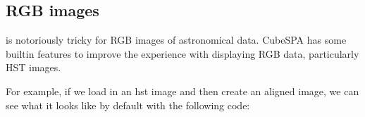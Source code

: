 \documentclass[letterpaper,10pt,english]{sphinxmanual}
\begin{document}
\subsection{RGB images}
\label{\detokenize{getting_started:rgb-images}}
\sphinxAtStartPar
{} is notoriously tricky for RGB images of astronomical data. CubeSPA has some built\sphinxhyphen{}in features
to improve the experience with displaying RGB data, particularly HST images.

\sphinxAtStartPar
For example, if we load in an hst image and then create an aligned image, we can see what it looks like by
default with the following code:

\begin{sphinxVerbatim}[commandchars=\\\{\}]
    
   
\end{sphinxVerbatim}

\begin{sphinxVerbatim}[commandchars=\\\{\}]
   
\end{sphinxVerbatim}

\begin{sphinxVerbatim}[commandchars=\\\{\}]
  
\end{sphinxVerbatim}
\end{document}
